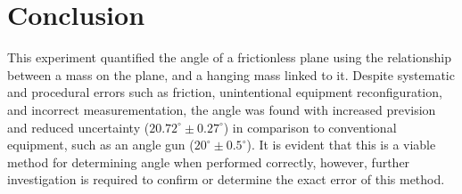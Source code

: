 \documentclass[11pt,a4paper]{article}
\begin{document}
\section{Conclusion}
This experiment quantified the angle of a frictionless plane using the relationship between a mass on the plane, and a hanging mass linked to it. Despite systematic and procedural errors such as friction, unintentional equipment reconfiguration, and incorrect measurementation, the angle was found with increased prevision and reduced uncertainty ($20.72^\circ \pm 0.27^\circ$) in comparison to conventional equipment, such as an angle gun ($20^\circ \pm 0.5^\circ$). It is evident that this is a viable method for determining angle when performed correctly, however, further investigation is required to confirm or determine the exact error of this method.



\newpage



	
\end{document}
